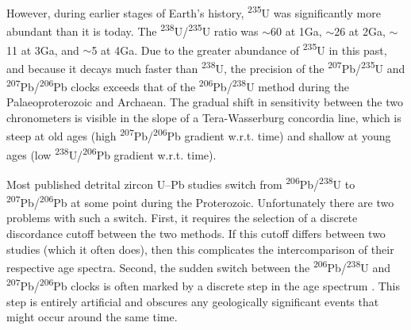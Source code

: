 \documentclass{article}
\begin{document}
However, during earlier stages of Earth's history,
\textsuperscript{235}U was significantly more abundant than it is
today. The \textsuperscript{238}U/\textsuperscript{235}U ratio was
$\sim$60 at 1Ga, $\sim$26 at 2Ga, $\sim$11 at 3Ga, and $\sim$5 at 4Ga.
Due to the greater abundance of \textsuperscript{235}U in this past,
and because it decays much faster than \textsuperscript{238}U, the
precision of the \textsuperscript{207}Pb/\textsuperscript{235}U and
\textsuperscript{207}Pb/\textsuperscript{206}Pb clocks exceeds that of
the \textsuperscript{206}Pb/\textsuperscript{238}U method during the
Palaeoproterozoic and Archaean. The gradual shift in sensitivity
between the two chronometers is visible in the slope of a
Tera-Wasserburg concordia line, which is steep at old ages (high
\textsuperscript{207}Pb/\textsuperscript{206}Pb gradient w.r.t. time)
and shallow at young ages (low
\textsuperscript{238}U/\textsuperscript{206}Pb gradient
w.r.t. time).

Most published detrital zircon U--Pb studies switch from
\textsuperscript{206}Pb/\textsuperscript{238}U to
\textsuperscript{207}Pb/\textsuperscript{206}Pb at some point during
the Proterozoic. Unfortunately there are two problems with such a
switch. First, it requires the selection of a discrete discordance
cutoff between the two methods. If this cutoff differs between two
studies (which it often does), then this complicates the
intercomparison of their respective age spectra. Second, the sudden
switch between the \textsuperscript{206}Pb/\textsuperscript{238}U and
\textsuperscript{207}Pb/\textsuperscript{206}Pb clocks is often marked
by a discrete step in the age spectrum \citep{puetz2018}. This step is
entirely artificial and obscures any geologically significant events
that might occur around the same time.
\end{document}
